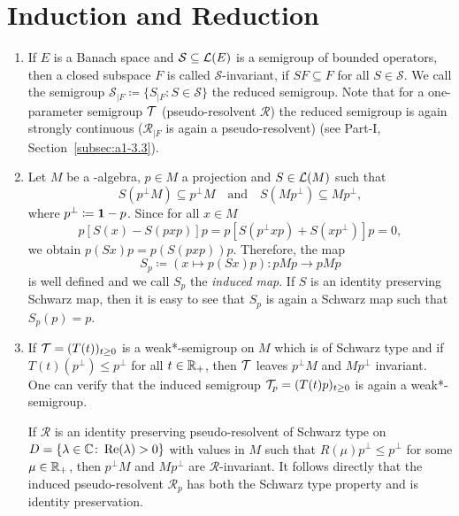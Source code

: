 \section{Induction and Reduction}\label{sec:d1-3}
\begin{enumerate}[1., wide, labelindent=.25em]
\item
If\/ $ E $ is a Banach space and $ \mathcal{S} \subseteq \mathcal{L}(E) $ is a semigroup of bounded operators, then a closed subspace $ F $ is called $ \mathcal{S} $-invariant, if\/ $ SF \subseteq F $ for all $ S \in \mathcal{S} $.
We call the semigroup $ \mathcal{S}_{\vert F} \coloneq \{S_{\vert F} \colon S \in \mathcal{S} \} $ the reduced semigroup.
Note that for a one-parameter semigroup $ \mathcal{T} $ (\resp pseudo-resolvent $ \mathcal{R} $) the reduced semigroup is again strongly continuous (\resp $ \mathcal{R}_{\vert F} $ is again a pseudo-resolvent) (see Part-I, Section~\ref{subsec:a1-3.3}).

\item\label{item:d1-3.2}
Let $ M $ be a \WA-algebra, $ p \in M $ a projection and $ S \in \mathcal{L}(M) $ such that 
%
\[
	S( p^{\perp}M ) \subseteq p^{\perp}M 
	\quad \text{and} \quad 
	S( Mp^{\perp}) \subseteq Mp^{\perp} ,  
\]
%
where $ p^{\perp} \coloneq \mathbf{1}-p $.
Since for all $ x \in M $
\[
p[S(x) - S(pxp)]p = p[S(p^{\perp}xp) + S(xp^{\perp})]p = 0,
\]
we obtain $ p(Sx)p = p(S(pxp))p $.
Therefore, the map
\[
S_{p} \coloneq (x \mapsto p(Sx)p) \colon pMp \to pMp
\]
is well defined and we call $ S_{p} $ the \emph{induced map}.
If\/ $ S $ is an identity preserving Schwarz map, then it is easy to see that $ S_{p} $ is again a Schwarz map such that $ S_{p}(p) = p $.

\item
If\/ $ \TT = (T(t))_{t\geq0} $ is a weak*-semigroup on $ M $ which is of Schwarz type and if\/ $ T(t)(p^{\perp}) \leq p^{\perp} $ for all $ t \in \mathbb{R}_{+} $, then $ \mathcal{T} $ leaves $ p^{\perp}M $ and $ Mp^{\perp} $ invariant.
One can verify that the induced semigroup $\TT_p = (T(t)p)_{t \geq 0}$ is again a weak*-semigroup.

If  $ \mathcal{R} $ is an identity preserving pseudo-resolvent of Schwarz type on $ D = \{\lambda \in \mathbb{C} \colon \mathop{}\!\mathrm{Re}(\lambda) > 0\} $ with values in $ M $ such that $ R(\mu)p^{\perp} \leq p^{\perp} $ for some $ \mu \in \mathbb{R}_{+} $, then $ p^{\perp}M $ and $ Mp^{\perp} $ are  $ \mathcal{R} $-invariant.
It follows directly that the induced pseudo-resolvent $ \mathcal{R}_p$ has both the Schwarz type property and is identity preservation.


\end{enumerate}
